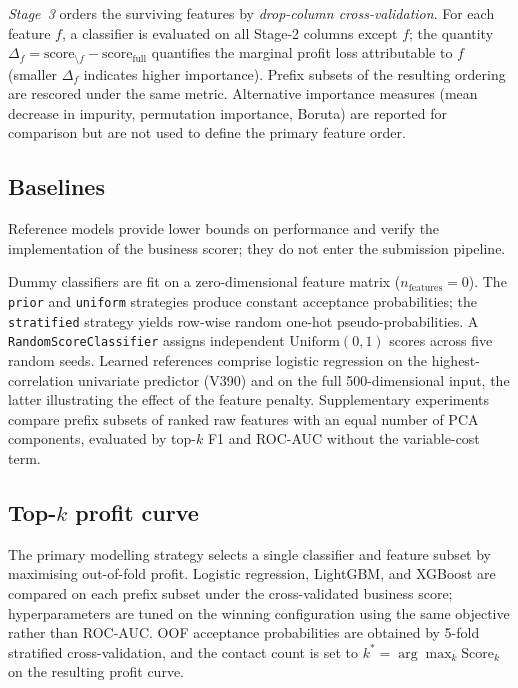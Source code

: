 \documentclass[cameraready]{Interspeech}
\begin{document}
\emph{Stage~3} orders the surviving features by \emph{drop-column cross-validation}.
For each feature $f$, a classifier is evaluated on all Stage-2 columns except $f$; the quantity
$\Delta_f = \text{score}_{\setminus f} - \text{score}_{\text{full}}$
quantifies the marginal profit loss attributable to $f$ (smaller $\Delta_f$ indicates higher importance).
Prefix subsets of the resulting ordering are rescored under the same metric.
Alternative importance measures (mean decrease in impurity, permutation importance, Boruta) are reported for comparison but are not used to define the primary feature order.

\subsection{Baselines}
\label{sec:baselines}

Reference models provide lower bounds on performance and verify the implementation of the business scorer; they do not enter the submission pipeline.

Dummy classifiers are fit on a zero-dimensional feature matrix ($n_{\mathrm{features}} = 0$).
The \texttt{prior} and \texttt{uniform} strategies produce constant acceptance probabilities; the \texttt{stratified} strategy yields row-wise random one-hot pseudo-probabilities.
A \texttt{RandomScoreClassifier} assigns independent $\mathrm{Uniform}(0,1)$ scores across five random seeds.
Learned references comprise logistic regression on the highest-correlation univariate predictor (V390) and on the full 500-dimensional input, the latter illustrating the effect of the feature penalty.
Supplementary experiments compare prefix subsets of ranked raw features with an equal number of PCA components, evaluated by top-$k$ F1 and ROC-AUC without the variable-cost term.

\subsection{Top-$k$ profit curve}
\label{sec:topk}

The primary modelling strategy selects a single classifier and feature subset by maximising out-of-fold profit.
Logistic regression, LightGBM, and XGBoost are compared on each prefix subset under the cross-validated business score; hyperparameters are tuned on the winning configuration using the same objective rather than ROC-AUC.
OOF acceptance probabilities are obtained by 5-fold stratified cross-validation, and the contact count is set to
$k^* = \arg\max_k \mathrm{Score}_k$ on the resulting profit curve.
\end{document}
